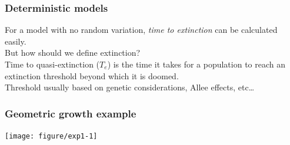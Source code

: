 \documentclass[color=usenames,dvipsnames]{beamer}\usepackage[]{graphicx}\usepackage[]{color}
\begin{document}
\begin{frame}
  \frametitle{Deterministic models}
  \Large
  For a model with no random variation, \textit{time to extinction} can
      be calculated easily. \\
  \pause \vfill
  But how should we define extinction? \\
  \pause \vfill
  Time to quasi-extinction ($T_e$) is the time it takes for a
      population to reach an extinction threshold beyond which it is
      doomed. \\
  \pause \vfill
  Threshold usually based on genetic considerations, Allee
      effects, etc\dots
\end{frame}





\begin{frame}[fragile]
  \frametitle{Geometric growth example}

\texttt{[image: figure/exp1-1]}
\end{frame}



\end{document}
